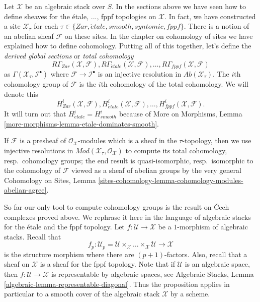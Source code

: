 \documentclass{stacks-project}
\theoremstyle{plain}
\theoremstyle{definition}
\theoremstyle{remark}
\numberwithin{equation}{subsection}
\def\etale{{\acute{e}tale}}
\begin{document}
\noindent
Let $\mathcal{X}$ be an algebraic stack over $S$. In the sections above
we have seen how to define sheaves for the \'etale, ..., fppf
topologies on $\mathcal{X}$. In fact, we have constructed a site
$\mathcal{X}_\tau$ for each $\tau \in \{Zar, \etale, smooth, syntomic,
fppf\}$. There is a notion of an abelian sheaf $\mathcal{F}$ on these sites.
In the chapter on cohomology of sites we have explained how to define
cohomology. Putting all of this together, let's define the
{\it derived global sections} or {\it total cohomology}
$$
R\Gamma_{Zar}(\mathcal{X}, \mathcal{F}),
R\Gamma_\etale(\mathcal{X}, \mathcal{F}), \ldots,
R\Gamma_{fppf}(\mathcal{X}, \mathcal{F})
$$
as $\Gamma(\mathcal{X}_\tau, \mathcal{I}^\bullet)$ where
$\mathcal{F} \to \mathcal{I}^\bullet$ is an injective resolution
in $\textit{Ab}(\mathcal{X}_\tau)$. The $i$th cohomology group of $\mathcal{F}$
is the $i$th cohomology of the total cohomology. We will denote
this
$$
H^i_{Zar}(\mathcal{X}, \mathcal{F}),
H^i_\etale(\mathcal{X}, \mathcal{F}), \ldots,
H^i_{fppf}(\mathcal{X}, \mathcal{F}).
$$
It will turn out that $H^i_\etale = H^i_{smooth}$ because of
More on Morphisms, Lemma \ref{more-morphisms-lemma-etale-dominates-smooth}.

\medskip\noindent
If $\mathcal{F}$ is a presheaf of $\mathcal{O}_\mathcal{X}$-modules
which is a sheaf in the $\tau$-topology, then we use injective
resolutions in $\textit{Mod}(\mathcal{X}_\tau, \mathcal{O}_\mathcal{X})$
to compute its total cohomology, resp.\ cohomology groups;
the end result is quasi-isomorphic, resp.\ isomorphic to the cohomology
of $\mathcal{F}$ viewed as a sheaf of abelian groups by the very general
Cohomology on Sites, Lemma
\ref{sites-cohomology-lemma-cohomology-modules-abelian-agree}.

\medskip\noindent
So far our only tool to compute cohomology groups is the result on
{\v C}ech complexes proved above. We rephrase it here in the language
of algebraic stacks for the \'etale and the fppf topology. Let
$f : \mathcal{U} \to \mathcal{X}$ be a $1$-morphism of algebraic stacks.
Recall that
$$
f_p : \mathcal{U}_p =
\mathcal{U} \times_\mathcal{X} \ldots \times_\mathcal{X} \mathcal{U}
\longrightarrow
\mathcal{X}
$$
is the structure morphism where there are $(p + 1)$-factors. Also, recall
that a sheaf on $\mathcal{X}$ is a sheaf for the fppf topology. Note
that if $\mathcal{U}$ is an algebraic space, then
$f : \mathcal{U} \to \mathcal{X}$ is representable by algebraic spaces,
see
Algebraic Stacks, Lemma \ref{algebraic-lemma-representable-diagonal}.
Thus the proposition applies in particular to a smooth cover of the
algebraic stack $\mathcal{X}$ by a scheme.
\end{document}
